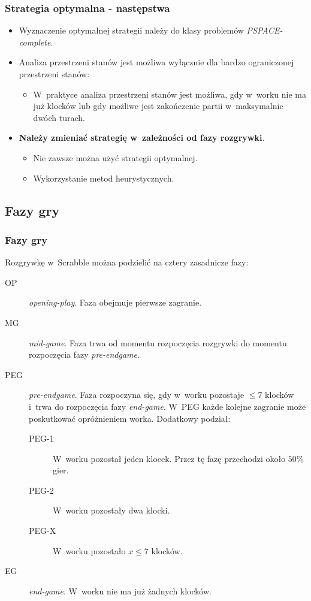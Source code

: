 \documentclass[10pt,a4paper]{beamer}
\begin{document}
\begin{frame}
	\frametitle{Strategia optymalna - następstwa}

	\begin{itemize}
		\item Wyznaczenie optymalnej strategii należy do klasy problemów \emph{PSPACE-complete}.
		\item Analiza przestrzeni stanów jest możliwa wyłącznie dla bardzo ograniczonej przestrzeni stanów:
			\begin{itemize}
				\item W~praktyce analiza przestrzeni stanów jest możliwa, gdy w~worku nie ma już klocków lub gdy możliwe jest zakończenie partii w~maksymalnie dwóch turach.
			\end{itemize}
		\item \textbf{Należy zmieniać strategię w~zależności od fazy rozgrywki}.
			\begin{itemize}
				\item Nie zawsze można użyć strategii optymalnej.
				\item Wykorzystanie metod heurystycznych.
			\end{itemize}
	\end{itemize}
\end{frame}

\subsection{Fazy gry}

\begin{frame}
	\frametitle{Fazy gry}
	
	Rozgrywkę w~Scrabble można podzielić na cztery zasadnicze fazy:

	\begin{description}
		\item[OP] \emph{opening-play}. Faza obejmuje pierwsze zagranie.
		\item[MG] \emph{mid-game}. Faza trwa od momentu rozpoczęcia rozgrywki do momentu rozpoczęcia fazy \emph{pre-endgame}.
		\item[PEG] \emph{pre-endgame}. Faza rozpoczyna się, gdy w~worku pozostaje $\leq 7$ klocków i~trwa do rozpoczęcia fazy \emph{end-game}. W~PEG każde kolejne zagranie może poskutkować opróżnieniem worka. Dodatkowy podział:
			\begin{description}
				\item[PEG-1] W~worku pozostał jeden klocek. Przez tę fazę przechodzi około $50\%$ gier.
				\item[PEG-2] W~worku pozostały dwa klocki.
				\item[PEG-X] W~worku pozostało $x \leq 7$ klocków.
			\end{description}
		\item[EG] \emph{end-game}. W~worku nie ma już żadnych klocków.
	\end{description}
\end{frame}
\end{document}
